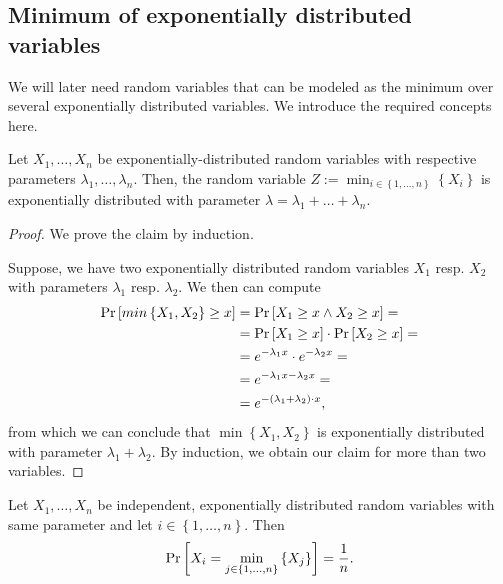 \subsection{Minimum of exponentially distributed variables}
\label{sec:probability-misc}

We will later need random variables that can be modeled as the minimum over several exponentially distributed variables. We introduce the required concepts here.

\begin{theorem}
  \label{thm:minimum-of-exponential-distribution-is-exponential}
  Let $X_1,\dots,X_n$ be exponentially-distributed random variables with respective parameters $\lambda_1,\dots,\lambda_n$. Then, the random variable $Z:=\min_{i\in\left\{ 1,\dots,n \right\}} \left\{ X_i \right\}$ is exponentially distributed with parameter $\lambda=\lambda_1+\dots+\lambda_n$.
\end{theorem}

\begin{proof}
  We prove the claim by induction. 

  Suppose, we have two exponentially distributed random variables $X_1$ resp. $X_2$ with parameters $\lambda_1$ resp. $\lambda_2$. We then can compute
  \begin{align*}
    \operatorname{Pr}\left[min\left\{ X_1,X_2 \right\} \geq x\right] & = \operatorname{Pr}\left[X_1 \geq x \wedge X_2 \geq x\right] = \\ 
    & = \operatorname{Pr}\left[X_1 \geq x\right]\cdot\operatorname{Pr}\left[X_2 \geq x\right] = \\
    & = e^{-\lambda_1 x} \cdot e^{-\lambda_2 x} = \\
    & = e^{-\lambda_1 x - \lambda_2 x} = \\
    & = e^{-\left( \lambda_1+\lambda_2 \right) \cdot x},
  \end{align*}
  from which we can conclude that $\min\left\{ X_1,X_2 \right\}$ is exponentially distributed with parameter $\lambda_1 + \lambda_2$. By induction, we obtain our claim for more than two variables.
\end{proof}

\begin{theorem}
  \label{thm:iid-cont-rand-var-minimum}
  Let $X_1,\dots,X_n$ be independent, exponentially distributed random variables with same parameter and let $i\in\left\{ 1,\dots,n \right\}$. Then 
  \begin{equation}
    \label{eq:probability-that-cont-random-variable-is-smallest-out-of-iid-is-one-over-n}
    \operatorname{Pr}\left[X_i = \min_{j\in\left\{ 1,\dots,n \right\}}\left\{ X_j \right\}\right] = \frac{1}{n}.
  \end{equation}
\end{theorem}

